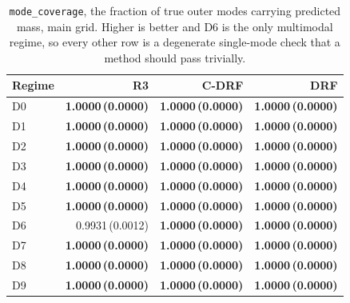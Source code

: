 \begin{table}[htbp]
\centering
\caption{\texttt{mode\_coverage}, the fraction of true outer modes carrying predicted mass, main grid. Higher is better and D6 is the only multimodal regime, so every other row is a degenerate single-mode check that a method should pass trivially.}
\label{tab:all-mode}
\scriptsize
\setlength{\tabcolsep}{3.2pt}
\begin{tabular}{@{}lrrr@{}}
\toprule
Regime & R3 & C-DRF & DRF \\
\midrule
D0 & \textbf{1.0000\,(0.0000)} & \textbf{1.0000\,(0.0000)} & \textbf{1.0000\,(0.0000)} \\
D1 & \textbf{1.0000\,(0.0000)} & \textbf{1.0000\,(0.0000)} & \textbf{1.0000\,(0.0000)} \\
D2 & \textbf{1.0000\,(0.0000)} & \textbf{1.0000\,(0.0000)} & \textbf{1.0000\,(0.0000)} \\
D3 & \textbf{1.0000\,(0.0000)} & \textbf{1.0000\,(0.0000)} & \textbf{1.0000\,(0.0000)} \\
D4 & \textbf{1.0000\,(0.0000)} & \textbf{1.0000\,(0.0000)} & \textbf{1.0000\,(0.0000)} \\
D5 & \textbf{1.0000\,(0.0000)} & \textbf{1.0000\,(0.0000)} & \textbf{1.0000\,(0.0000)} \\
D6 & 0.9931\,(0.0012) & \textbf{1.0000\,(0.0000)} & \textbf{1.0000\,(0.0000)} \\
D7 & \textbf{1.0000\,(0.0000)} & \textbf{1.0000\,(0.0000)} & \textbf{1.0000\,(0.0000)} \\
D8 & \textbf{1.0000\,(0.0000)} & \textbf{1.0000\,(0.0000)} & \textbf{1.0000\,(0.0000)} \\
D9 & \textbf{1.0000\,(0.0000)} & \textbf{1.0000\,(0.0000)} & \textbf{1.0000\,(0.0000)} \\
\bottomrule
\end{tabular}
\end{table}

